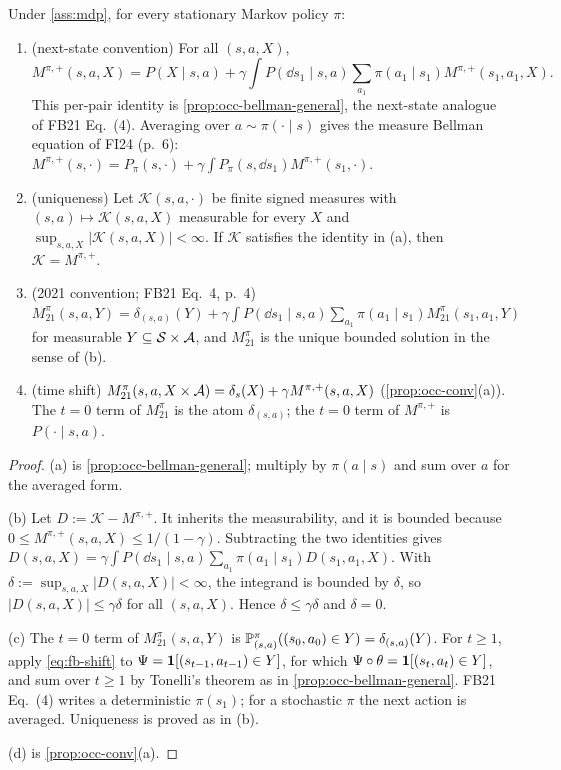 \begin{proposition}\label{prop:fb-bellman}
Under \cref{ass:mdp}, for every stationary Markov policy $\pi$:
\begin{enumerate}[nosep,label=(\alph*)]
\item (next-state convention) For all $(s,a,X)$,
  \[M^{\pi,+}(s,a,X)=P(X\mid s,a)+\gamma\int P(\dd s_1\mid s,a)\sum_{a_1}\pi(a_1\mid s_1)M^{\pi,+}(s_1,a_1,X).\]
  This per-pair identity is \cref{prop:occ-bellman-general}, the next-state analogue of FB21 Eq.~(4).
  Averaging over $a\sim\pi(\cdot\mid s)$ gives the measure Bellman equation of FI24 (p.~6): $M^{\pi,+}(s,\cdot)=P_\pi(s,\cdot)+\gamma\int P_\pi(s,\dd s_1)M^{\pi,+}(s_1,\cdot)$.
\item (uniqueness) Let $\mathcal K(s,a,\cdot)$ be finite signed measures with $(s,a)\mapsto\mathcal K(s,a,X)$ measurable for every $X$ and $\sup_{s,a,X}|\mathcal K(s,a,X)|<\infty$.
  If $\mathcal K$ satisfies the identity in (a), then $\mathcal K=M^{\pi,+}$.
\item (2021 convention; FB21 Eq.~4, p.~4)
  $M^\pi_{21}(s,a,Y)=\delta_{(s,a)}(Y)+\gamma\int P(\dd s_1\mid s,a)\sum_{a_1}\pi(a_1\mid s_1)M^\pi_{21}(s_1,a_1,Y)$ for measurable $Y\subseteq\mathcal{S}\times\mathcal{A}$, and $M^\pi_{21}$ is the unique bounded solution in the sense of (b).
\item (time shift) $M^\pi_{21}(s,a,X\times\mathcal{A})=\delta_s(X)+\gamma M^{\pi,+}(s,a,X)$ (\cref{prop:occ-conv}(a)).
  The $t=0$ term of $M^\pi_{21}$ is the atom $\delta_{(s,a)}$; the $t=0$ term of $M^{\pi,+}$ is $P(\cdot\mid s,a)$.
\end{enumerate}
\end{proposition}
\begin{proof}
(a) is \cref{prop:occ-bellman-general}; multiply by $\pi(a\mid s)$ and sum over $a$ for the averaged form.

(b) Let $D:=\mathcal K-M^{\pi,+}$. It inherits the measurability, and it is bounded because $0\le M^{\pi,+}(s,a,X)\le1/(1-\gamma)$.
Subtracting the two identities gives $D(s,a,X)=\gamma\int P(\dd s_1\mid s,a)\sum_{a_1}\pi(a_1\mid s_1)D(s_1,a_1,X)$.
With $\delta:=\sup_{s,a,X}|D(s,a,X)|<\infty$, the integrand is bounded by $\delta$, so $|D(s,a,X)|\le\gamma\delta$ for all $(s,a,X)$.
Hence $\delta\le\gamma\delta$ and $\delta=0$.

(c) The $t=0$ term of $M^\pi_{21}(s,a,Y)$ is $\mathbb{P}^\pi_{(s,a)}((s_0,a_0)\in Y)=\delta_{(s,a)}(Y)$.
For $t\ge1$, apply \eqref{eq:fb-shift} to $\Psi=\mathbf{1}[(s_{t-1},a_{t-1})\in Y]$, for which $\Psi\circ\theta=\mathbf{1}[(s_t,a_t)\in Y]$, and sum over $t\ge1$ by Tonelli's theorem as in \cref{prop:occ-bellman-general}.
FB21 Eq.~(4) writes a deterministic $\pi(s_1)$; for a stochastic $\pi$ the next action is averaged.
Uniqueness is proved as in (b).

(d) is \cref{prop:occ-conv}(a).
\end{proof}

